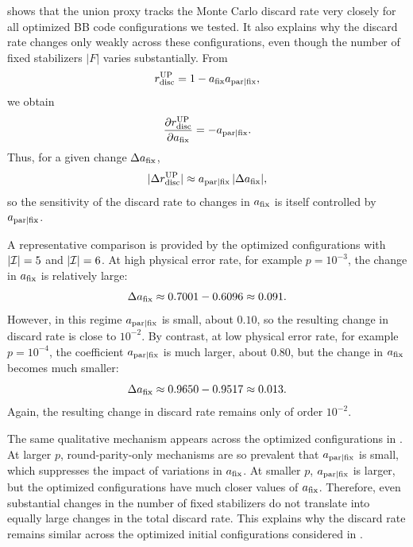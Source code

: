  shows that the union proxy tracks the Monte Carlo discard rate very closely for all optimized BB code configurations we tested.
It also explains why the discard rate changes only weakly across these configurations, even though the number of fixed stabilizers $|F|$ varies substantially.
From
\begin{equation}
    r_{\rm disc}^{\rm UP} = 1 - a_{\rm fix} a_{{\rm par}\mid{\rm fix}},
\end{equation}
we obtain
\begin{equation}
    \frac{\partial r_{\rm disc}^{\rm UP}}{\partial a_{\rm fix}} = -a_{{\rm par}\mid{\rm fix}}.
\end{equation}
Thus, for a given change $\Delta a_{\rm fix}$,
\begin{equation}
|\Delta r_{\rm disc}^{\rm UP}| \approx a_{{\rm par}\mid{\rm fix}}\,|\Delta a_{\rm fix}|,
\end{equation}
so the sensitivity of the discard rate to changes in $a_{\rm fix}$ is itself controlled by $a_{{\rm par}\mid{\rm fix}}$.

A representative comparison is provided by the optimized configurations with $|\mathcal{I}|=5$ and $|\mathcal{I}|=6$.
At high physical error rate, for example $p=10^{-3}$, the change in $a_{\rm fix}$ is relatively large:
\begin{equation}
\Delta a_{\rm fix} \approx 0.7001 - 0.6096 \approx 0.091.
\end{equation}
However, in this regime $a_{{\rm par}\mid{\rm fix}}$ is small, about $0.10$, so the resulting change in discard rate is close to $10^{-2}$.
By contrast, at low physical error rate, for example $p=10^{-4}$, the coefficient $a_{{\rm par}\mid{\rm fix}}$ is much larger, about $0.80$, but the change in $a_{\rm fix}$ becomes much smaller:
\begin{equation}
\Delta a_{\rm fix} \approx 0.9650 - 0.9517 \approx 0.013.
\end{equation}
Again, the resulting change in discard rate remains only of order $10^{-2}$.

The same qualitative mechanism appears across the optimized configurations in .
At larger $p$, round-parity-only mechanisms are so prevalent that $a_{{\rm par}\mid{\rm fix}}$ is small, which suppresses the impact of variations in $a_{\rm fix}$.
At smaller $p$, $a_{{\rm par}\mid{\rm fix}}$ is larger, but the optimized configurations have much closer values of $a_{\rm fix}$.
Therefore, even substantial changes in the number of fixed stabilizers do not translate into equally large changes in the total discard rate.
This explains why the discard rate remains similar across the optimized initial configurations considered in .

